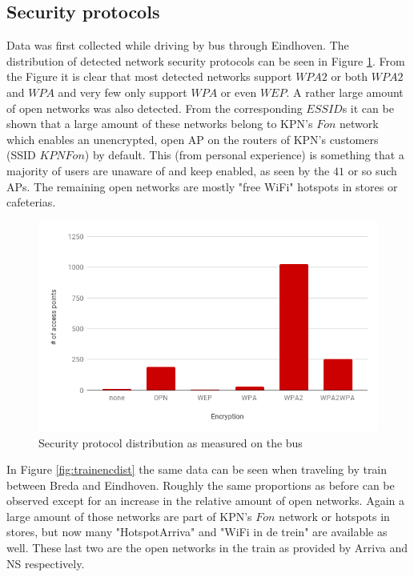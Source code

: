 \documentclass[letterpaper, 10 pt, conference]{ieeeconf}  %
\begin{document}
\subsection{Security protocols}
Data was first collected while driving by bus through Eindhoven. The distribution of detected network security protocols can be seen in Figure \ref{fig:busencdist}. From the Figure it is clear that most detected networks support $WPA2$ or both $WPA2$ and $WPA$ and very few only support $WPA$ or even $WEP$. A rather large amount of open networks was also detected. From the corresponding $ESSID$s it can be shown that a large amount of these networks belong to KPN's $Fon$ network which enables an unencrypted, open AP on the routers of KPN's customers (SSID $KPN Fon$) by default. This (from personal experience) is something that a majority of users are unaware of and keep enabled, as seen by the $41$ or so such APs. The remaining open networks are mostly "free WiFi" hotspots in stores or cafeterias. 

\begin{figure}[h]
\includegraphics[scale=0.4]{Figures/BusEncryptionCount.png}
\caption{Security protocol distribution as measured on the bus}
\label{fig:busencdist}
\end{figure}

In Figure \ref{fig:trainencdist} the same data can be seen when traveling by train between Breda and Eindhoven. Roughly the same proportions as before can be observed except for an increase in the relative amount of open networks. Again a large amount of those networks are part of KPN's $Fon$ network or hotspots in stores, but now many "HotspotArriva" and "WiFi in de trein" are available as well. These last two are the open networks in the train as provided by Arriva and NS respectively.
\end{document}
